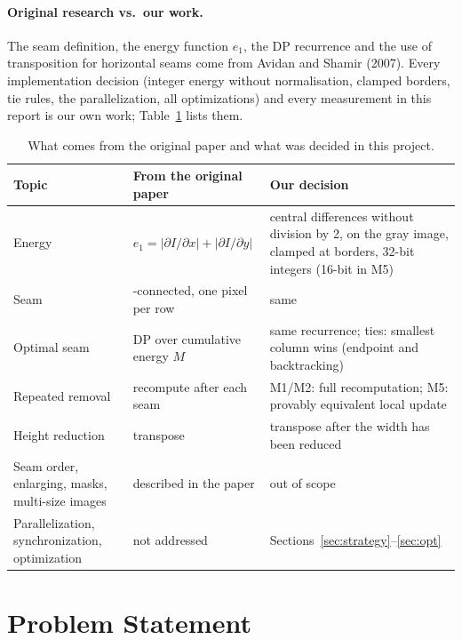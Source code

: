 \documentclass[11pt,a4paper]{article}
\begin{document}
\paragraph{Original research vs.\ our work.} The seam definition, the energy function $e_1$, the DP
recurrence and the use of transposition for horizontal seams come from Avidan and Shamir (2007). Every
implementation decision (integer energy without normalisation, clamped borders, tie rules, the
parallelization, all optimizations) and every measurement in this report is our own work;
Table~\ref{tab:origin} lists them.

\begin{table}[ht]
\centering\small
\begin{tabularx}{\textwidth}{@{}l>{\raggedright\arraybackslash}p{4.2cm}>{\raggedright\arraybackslash}X@{}}
\toprule
Topic & From the original paper & Our decision \\
\midrule
Energy & $e_1=|\partial I/\partial x|+|\partial I/\partial y|$ & central differences without division by 2,
  on the gray image, clamped at borders, 32-bit integers (16-bit in M5) \\
Seam & 8-connected, one pixel per row & same \\
Optimal seam & DP over cumulative energy $M$ & same recurrence; ties: smallest column wins (endpoint and backtracking) \\
Repeated removal & recompute after each seam & M1/M2: full recomputation; M5: provably equivalent local update \\
Height reduction & transpose & transpose after the width has been reduced \\
Seam order, enlarging, masks, multi-size images & described in the paper & out of scope \\
Parallelization, synchronization, optimization & not addressed & Sections~\ref{sec:strategy}--\ref{sec:opt} \\
\bottomrule
\end{tabularx}
\caption{What comes from the original paper and what was decided in this project.}
\label{tab:origin}
\end{table}

\section{Problem Statement}
\end{document}
